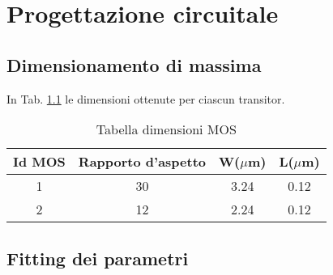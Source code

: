 
\chapter{Progettazione circuitale} %
\label{Chapter3} 

\section{Dimensionamento di massima}
\label{sec:sec_dimensionamentoMassima}

In Tab. \ref{tab:dimensioniMos} le dimensioni ottenute per ciascun transitor.

\begin{table}[htb]
	\centering
	\begin{tabular}{c*{3}{c}}
		\toprule
		Id MOS & Rapporto d'aspetto & W($\mu$m) & L($\mu$m)\\
		\midrule
		1 & 30 & 3.24 & 0.12\\
		2 & 12 & 2.24 & 0.12\\
		\bottomrule
	\end{tabular}
	\caption{Tabella dimensioni MOS}
	\label{tab:dimensioniMos}
\end{table}

\section{Fitting dei parametri}
\label{sec:sec_fittingParametri}








